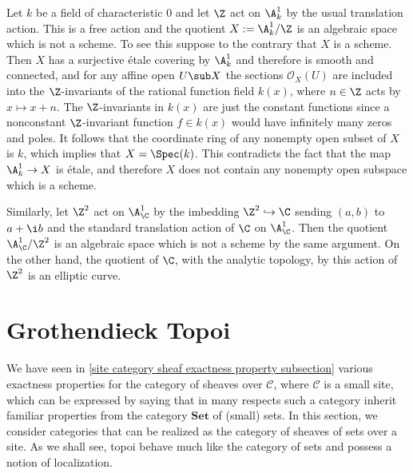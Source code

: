 \begin{example}
Let $k$ be a field of characteristic $0$ and let $\Z$ act on $\A^1_k$ by the usual translation action. This is a free action and the quotient $X:=\A^1_k/\Z$ is an algebraic space which is not a scheme. To see this suppose to the contrary that $X$ is a scheme. Then $X$ has a surjective \'etale covering by $\A^1_k$ and therefore is smooth and connected, and for any affine open $U\sub X$ the sections $\mathscr{O}_X(U)$ are included into the $\Z$-invariants of the rational function field $k(x)$, where $n\in\Z$ acts by $x\mapsto x+n$. The $\Z$-invariants in $k(x)$ are just the constant functions since a nonconstant $\Z$-invariant function $f\in k(x)$ would have infinitely many zeros and poles. It follows that the coordinate ring of any nonempty open subset of $X$ is $k$, which implies that $X=\Spec(k)$. This contradicts the fact that the map $\A^1_k\to X$ is \'etale, and therefore $X$ does not contain any nonempty open subspace which is a scheme.\par
Similarly, let $\Z^2$ act on $\A^1_\C$ by the imbedding $\Z^2\hookrightarrow\C$ sending $(a,b)$ to $a+\i b$ and the standard translation action of $\C$ on $\A^1_{\C}$. Then the quotient $\A^1_{\C}/\Z^2$ is an algebraic space which is not a scheme by the same argument. On the other hand, the quotient of $\C$, with the analytic topology, by this action of $\Z^2$ is an elliptic curve.
\end{example}


\section{Grothendieck Topoi}
We have seen in \autoref{site category sheaf exactness property subsection} various exactness properties for the category of sheaves over $\mathcal{C}$, where $\mathcal{C}$ is a small site, which can be expressed by saying that in many respects such a category inherit familiar properties from the category $\mathbf{Set}$ of (small) sets. In this section, we consider categories that can be realized as the category of sheaves of sets over a site. As we shall see, topoi behave much like the category of sets and possess a notion of localization.

